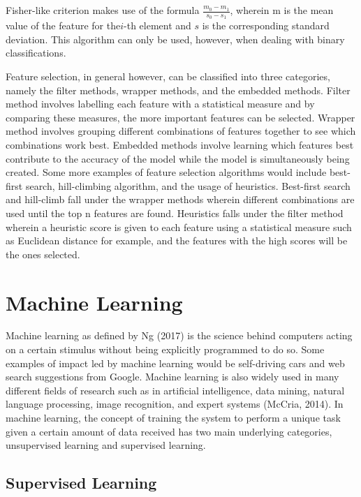 Fisher-like criterion makes use of the formula $\frac{m_0-m_1}{s_0-s_1}$, wherein m is the mean value of the feature for the$i$-th element and $s$ is the corresponding standard deviation. This algorithm can only be used, however, when dealing with binary classifications.

Feature selection, in general however, can be classified into three categories, namely the filter methods, wrapper methods, and the embedded methods. Filter method involves labelling each feature with a statistical measure and by comparing these measures, the more important features can be selected. Wrapper method involves grouping different combinations of features together to see which combinations work best. Embedded methods involve learning which features best contribute to the accuracy of the model while the model is simultaneously being created. Some more examples of feature selection algorithms would include best-first search, hill-climbing algorithm, and the usage of heuristics. Best-first search and hill-climb fall under the wrapper methods wherein different combinations are used until the top n features are found. Heuristics falls under the filter method wherein a heuristic score is given to each feature using a statistical measure such as Euclidean distance for example, and the features with the high scores will be the ones selected.

\section{Machine Learning}

Machine learning as defined by Ng (2017) is the science behind computers acting on a certain stimulus without being explicitly programmed to do so. Some examples of impact led by machine learning would be self-driving cars and web search suggestions from Google. Machine learning is also widely used in many different fields of research such as in artificial intelligence, data mining, natural language processing, image recognition, and expert systems (McCria, 2014). In machine learning, the concept of training the system to perform a unique task given a certain amount of data received has two main underlying categories, unsupervised learning and supervised learning.

\subsection{Supervised Learning}


